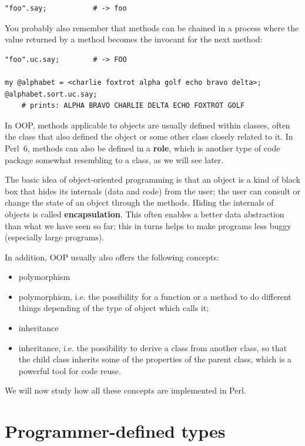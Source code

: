 \begin{verbatim}
"foo".say;           # -> foo
\end{verbatim}

You probably also remember that methods can be chained in a 
process where the value returned by a method becomes the 
invocant for the next method:

\begin{verbatim}
"foo".uc.say;        # -> FOO

my @alphabet = <charlie foxtrot alpha golf echo bravo delta>;
@alphabet.sort.uc.say;
    # prints: ALPHA BRAVO CHARLIE DELTA ECHO FOXTROT GOLF 
\end{verbatim}

In OOP, methods applicable to objects are usually defined 
within classes, often the class that also defined the 
object or some other class closely related to it. In Perl~6, 
methods can also be defined in a {\bf role}, which is 
another type of code package somewhat resembling to a class, 
as we will see later.

The basic idea of object-oriented programming is that an 
object is a kind of black box that hides its internals
(data and code) from the user; the user can consult or change 
the state of an object through the methods. Hiding the 
internals of objects is called {\bf encapsulation}. This 
often enables a better data abstraction than what we have 
seen so far; this in turns helps to make programs less 
buggy (especially large programs).

In addition, OOP usually also offers the following concepts:
\begin{itemize}
\item{polymorphism}
\item polymorphism, i.e. the possibility for a function or 
a method to do different things depending of the type of 
object which calls it;
\item{inheritance}
\item inheritance, i.e. the possibility to derive a class from 
another class, so that the child class inherits some of 
the properties of the parent class, which is a powerful tool 
for code reuse.
\end{itemize}

We will now study how all these concepts are implemented in Perl.


\section{Programmer-defined types}
\label{point}

